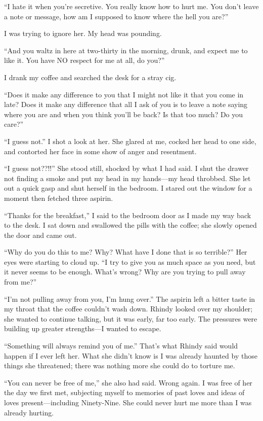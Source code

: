 ``I hate it when you're secretive. You really know how to hurt me. You
don't leave a note or message, how am I supposed to know where the hell
you are?''

I was trying to ignore her. My head was pounding.

``And you waltz in here at two-thirty in the morning, drunk, and expect
me to like it. You have NO respect for me at all, do you?''

I drank my coffee and searched the desk for a stray cig.

``Does it make any difference to you that I might not like it that you
come in late? Does it make any difference that all I ask of you is to
leave a note saying where you are and when you think you'll be back? Is
that too much? Do you care?''

``I guess not.'' I shot a look at her. She glared at me, cocked her head
to one side, and contorted her face in some show of anger and
resentment.

``I guess not??!!'' She stood still, shocked by what I had said. I shut
the drawer not finding a smoke and put my head in my hands---my head
throbbed. She let out a quick gasp and shut herself in the bedroom. I
stared out the window for a moment then fetched three aspirin.

``Thanks for the breakfast,'' I said to the bedroom door as I made my
way back to the desk. I sat down and swallowed the pills with the
coffee; she slowly opened the door and came out.

``Why do you do this to me? Why? What have I done that is so terrible?''
Her eyes were starting to cloud up. ``I try to give you as much space as
you need, but it never seems to be enough. What's wrong? Why are you
trying to pull away from me?''

``I'm not pulling away from you, I'm hung over.'' The aspirin left a
bitter taste in my throat that the coffee couldn't wash down. Rhindy
looked over my shoulder; she wanted to continue talking, but it was
early, far too early. The pressures were building up greater
strengths---I wanted to escape.

``Something will always remind you of me.'' That's what Rhindy said
would happen if I ever left her. What she didn't know is I was already
haunted by those things she threatened; there was nothing more she could
do to torture me.

``You can never be free of me,'' she also had said. Wrong again. I was
free of her the day we first met, subjecting myself to memories of past
loves and ideas of loves present---including Ninety-Nine. She could
never hurt me more than I was already hurting.

